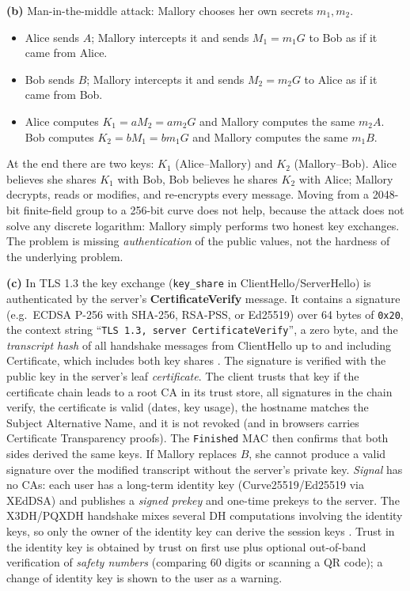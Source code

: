 \documentclass[11pt,a4paper]{article}
\begin{document}
\textbf{(b)} Man-in-the-middle attack: Mallory chooses her own secrets $m_1, m_2$.
\begin{itemize}
\item Alice sends $A$; Mallory intercepts it and sends $M_1 = m_1 G$ to Bob as if it came from Alice.
\item Bob sends $B$; Mallory intercepts it and sends $M_2 = m_2 G$ to Alice as if it came from Bob.
\item Alice computes $K_1 = aM_2 = am_2G$ and Mallory computes the same $m_2A$.
Bob computes $K_2 = bM_1 = bm_1G$ and Mallory computes the same $m_1B$.
\end{itemize}
At the end there are two keys: $K_1$ (Alice--Mallory) and $K_2$ (Mallory--Bob). Alice believes she shares
$K_1$ with Bob, Bob believes he shares $K_2$ with Alice; Mallory decrypts, reads or modifies, and re-encrypts every message.
Moving from a 2048-bit finite-field group to a 256-bit curve does not help, because the attack does not
solve any discrete logarithm: Mallory simply performs two honest key exchanges. The problem is
missing \emph{authentication} of the public values, not the hardness of the underlying problem.

\textbf{(c)} In TLS 1.3 the key exchange (\texttt{key\_share} in ClientHello/ServerHello) is
authenticated by the server's \textbf{CertificateVerify} message. It contains a signature (e.g.\
ECDSA P-256 with SHA-256, RSA-PSS, or Ed25519) over 64 bytes of \texttt{0x20}, the context string
``\texttt{TLS 1.3, server CertificateVerify}'', a zero byte, and the \emph{transcript hash} of all handshake
messages from ClientHello up to and including Certificate, which includes both key shares
\cite{rfc8446}. The signature is verified with the public key in the server's leaf \emph{certificate}.
The client trusts that key if the certificate chain leads to a root CA in its trust store, all
signatures in the chain verify, the certificate is valid (dates, key usage), the hostname matches the
Subject Alternative Name, and it is not revoked (and in browsers carries Certificate Transparency
proofs). The \texttt{Finished} MAC then confirms that both sides derived the same keys. If Mallory
replaces $B$, she cannot produce a valid signature over the modified transcript without the server's private key.
\emph{Signal} has no CAs: each user has a long-term identity key (Curve25519/Ed25519 via XEdDSA) and
publishes a \emph{signed prekey} and one-time prekeys to the server. The X3DH/PQXDH handshake mixes
several DH computations involving the identity keys, so only the owner of the identity key can derive
the session keys \cite{x3dh,pqxdh}. Trust in the identity key is obtained by trust on first use plus
optional out-of-band verification of \emph{safety numbers} (comparing 60 digits or scanning a QR code);
a change of identity key is shown to the user as a warning.
\end{document}
